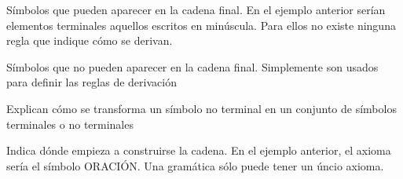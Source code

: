 \documentclass{apuntes}
\begin{document}
\begin{defn}
Símbolos que pueden aparecer en la cadena final. En el ejemplo anterior serían elementos terminales aquellos escritos en minúscula. Para ellos no existe ninguna regla que indique cómo se derivan.
\end{defn}

\begin{defn}
Símbolos que no pueden aparecer en la cadena final. Simplemente son usados para definir las reglas de derivación
\end{defn}

\begin{defn}
Explican cómo se transforma un símbolo no terminal en un conjunto de símbolos terminales o no terminales
\end{defn}

\begin{defn}
Indica dónde empieza a construirse la cadena. En el ejemplo anterior, el axioma sería el símbolo ORACIÓN. Una gramática sólo puede tener un úncio axioma.
\end{defn}
\end{document}
